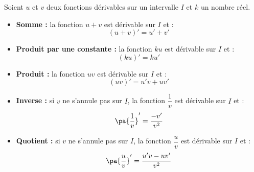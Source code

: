 \begin{propriete}
	Soient $u$ et $v$ deux fonctions dérivables sur un intervalle $I$ et $k$ un nombre réel.
	\begin{itemize}
		\item \textbf{Somme :} la fonction $u + v$ est dérivable sur $I$ et :
		      \[
			      (u + v)' = u' + v'
		      \]

		\item \textbf{Produit par une constante :} la fonction $ku$ est dérivable sur $I$ et :
		      \[
			      (ku)' = ku'
		      \]

		\item \textbf{Produit :} la fonction $uv$ est dérivable sur $I$ et :
		      \[
			      (uv)' = u'v + uv'
		      \]

		\item \textbf{Inverse :} si $v$ ne s'annule pas sur $I$, la fonction $\dfrac{1}{v}$ est dérivable sur $I$ et :
		      \[
			      \pa{\dfrac{1}{v}}' = \dfrac{-v'}{v^2}
		      \]

		\item \textbf{Quotient :} si $v$ ne s'annule pas sur $I$, la fonction $\dfrac{u}{v}$ est dérivable sur $I$ et :
		      \[
			      \pa{\dfrac{u}{v}}' = \dfrac{u'v - uv'}{v^2}
		      \]

	\end{itemize}
\end{propriete}

